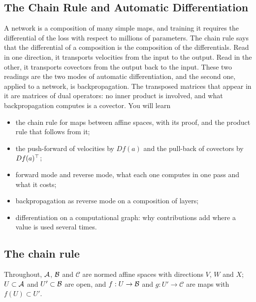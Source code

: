 \begin{notechapter}
\chapter{The Chain Rule and Automatic Differentiation}
\label{ch:chain-rule-autodiff}

\begin{chapterintro}
A network is a composition of many simple maps, and training it requires
the differential of the loss with respect to millions of parameters. The
chain rule says that the differential of a composition is the composition
of the differentials. Read in one direction, it transports velocities
from the input to the output. Read in the other, it transports covectors
from the output back to the input. These two readings are the two modes of
automatic differentiation, and the second one, applied to a network, is
backpropagation. The transposed matrices that appear in it are matrices of
dual operators: no inner product is involved, and what backpropagation
computes is a covector. You will learn
\begin{itemize}[nosep]
  \item the chain rule for maps between affine spaces, with its proof, and
        the product rule that follows from it;
  \item the push-forward of velocities by $Df(a)$ and the pull-back of
        covectors by $Df(a)^{\top}$;
  \item forward mode and reverse mode, what each one computes in one pass
        and what it costs;
  \item backpropagation as reverse mode on a composition of layers;
  \item differentiation on a computational graph: why contributions add
        where a value is used several times.
\end{itemize}
\end{chapterintro}

\section{The chain rule}\label{chain-rule-autodiff:sec:chain}

Throughout, $\mathcal{A}$, $\mathcal{B}$ and $\mathcal C$ are normed affine spaces with
directions $V$, $W$ and $X$; $U\subset\mathcal{A}$ and $U'\subset\mathcal{B}$ are open,
and $f:U\to\mathcal{B}$ and $g:U'\to\mathcal C$ are maps with $f(U)\subset U'$.


\end{notechapter}
